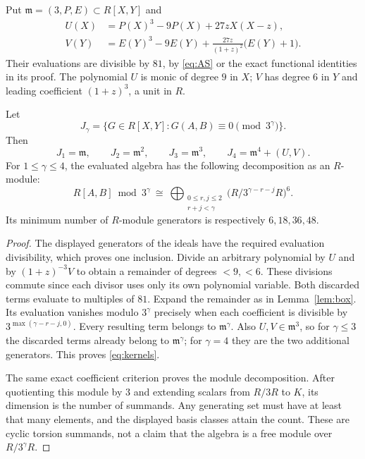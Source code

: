 Put $\mathfrak m=(3,P,E)\subset R[X,Y]$ and
\begin{align}
 U(X)&=P(X)^3-9P(X)+27zX(X-z),\label{eq:UV1}\\
 V(Y)&=E(Y)^3-9E(Y)
       +\frac{27z}{(1+z)^2}\bigl(E(Y)+1\bigr).\label{eq:UV2}
\end{align}
Their evaluations are divisible by $81$, by \eqref{eq:AS} or the
exact functional identities in its proof. The polynomial $U$ is
monic of degree $9$ in $X$; $V$ has degree $6$ in $Y$ and leading
coefficient $(1+z)^3$, a unit in $R$.

\begin{theorem}\label{thm:kernel}
Let
\[
 J_\gamma=\{G\in R[X,Y]:G(A,B)\equiv0\pmod{3^\gamma}\}.
\]
Then
\begin{equation}\label{eq:kernels}
 J_1=\mathfrak m,\qquad J_2=\mathfrak m^2,\qquad
 J_3=\mathfrak m^3,\qquad J_4=\mathfrak m^4+(U,V).
\end{equation}
For $1\le\gamma\le4$, the evaluated algebra has the following
decomposition as an $R$-module:
\begin{equation}\label{eq:module}
 R[A,B]\bmod3^\gamma\ \cong\
 \bigoplus_{\substack{0\le r,j\le2\\r+j<\gamma}}
       \bigl(R/3^{\gamma-r-j}R\bigr)^6.
\end{equation}
Its minimum number of $R$-module generators is respectively
$6,18,36,48$.
\end{theorem}
\begin{proof}
The displayed generators of the ideals have the required evaluation
divisibility, which proves one inclusion. Divide an arbitrary polynomial
by $U$ and by $(1+z)^{-3}V$ to obtain a remainder of degrees $<9,<6$.
These divisions commute since each divisor uses only its own polynomial
variable. Both discarded terms evaluate to multiples of $81$.
Expand the remainder as in Lemma~\ref{lem:box}. Its evaluation vanishes
modulo $3^\gamma$ precisely when each coefficient is divisible by
$3^{\max(\gamma-r-j,0)}$. Every resulting term belongs to
$\mathfrak m^\gamma$. Also $U,V\in\mathfrak m^3$, so for
$\gamma\le3$ the discarded terms already belong to
$\mathfrak m^\gamma$; for $\gamma=4$ they are the two additional
generators. This proves \eqref{eq:kernels}.

The same exact coefficient criterion proves the module decomposition.
After quotienting this module by $3$ and extending scalars from
$R/3R$ to $K$, its dimension is the number of summands. Any generating
set must have at least that many elements, and the displayed basis
classes attain the count. These are cyclic torsion summands, not a
claim that the algebra is a free module over $R/3^\gamma R$.
\end{proof}

